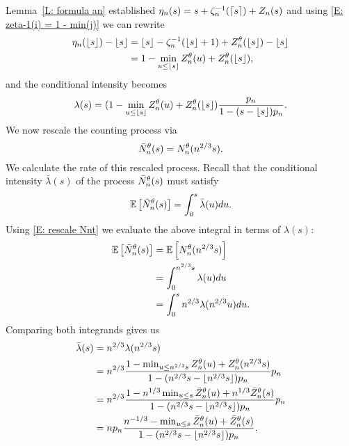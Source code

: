 Lemma~\ref{L: formula an} established $\eta_n(s) = s + \zeta^{-1}_n(\lceil s\rceil) + Z_n(s)$ 
and using \eqref{E: zeta-1(i) = 1 - min(j)} we can rewrite
\begin{equation*}
\begin{aligned}
\eta_n(\lfloor s\rfloor) - \lfloor s\rfloor 
&= \lfloor s\rfloor - \zeta^{-1}_n(\lfloor s\rfloor+1) + Z_n^{\theta}(\lfloor s\rfloor) - \lfloor s\rfloor \\
&= 1 - \min_{u \leq \lfloor s\rfloor} Z_n^{\theta}(u) + Z_n^{\theta}(\lfloor s\rfloor),
\end{aligned}
\end{equation*}
and the conditional intensity becomes
\begin{equation} \label{E: rate Nnt 2}
\lambda(s) = (1 - \min_{u \leq \lfloor s\rfloor} Z_n^{\theta}(u) + Z_n^{\theta}(\lfloor s\rfloor) \frac{p_n}{1-(s-\lfloor s\rfloor)p_n}.
\end{equation}
We now rescale the counting process via
\begin{equation} \label{E: rescale Nnt}
\bar{N}_n^{\theta}(s) = N_n^{\theta}(n^{2 / 3}s).
\end{equation}
We calculate the rate of this rescaled process.
Recall that the conditional intensity $\bar{\lambda}(s)$ of the process $\bar{N}_n^{\theta}(s)$ must satisfy
\begin{equation}
\mathbb{E} \left[ \bar{N}_n^{\theta}(s) \right] = \int_{0}^{s} \bar{\lambda}(u) du.
\end{equation}
Using \eqref{E: rescale Nnt} we evaluate the above integral in terms of $\lambda(s)$:
\begin{equation*}
\begin{aligned}
\mathbb{E} \left[ \bar{N}_n^{\theta}(s) \right]
&= \mathbb{E} \left[ N_n^{\theta}(n^{2 / 3}s) \right] \\
&= \int_{0}^{n^{2 / 3}s} \lambda(u) du \\
&= \int_{0}^{s} n^{2 / 3} \lambda(n^{2 / 3}u) du.
\end{aligned}
\end{equation*}
Comparing both integrands gives us
\begin{equation} \label{E: conditional intensity final}
\begin{aligned}
\bar{\lambda}(s)
&= n^{2 / 3} \lambda(n^{2 / 3}s) \\
&= n^{2 / 3} \frac{1 - \min_{u \leq n^{2 / 3}s} Z_n^{\theta}(u) + Z_n^{\theta}(n^{2 / 3}s)}{1 - (n^{2 / 3}s - \lfloor n^{2 / 3}s\rfloor)p_n} p_n \\
&= n^{2 / 3} \frac{1 - n^{1 / 3} \min_{u \leq s} \bar{Z}^{\theta}_n(u) + n^{1 / 3}\bar{Z}^{\theta}_n(s)}{1 - (n^{2 / 3}s - \lfloor n^{2 / 3}s\rfloor)p_n} p_n \\
&= n p_n \frac{n^{-1 / 3} - \min_{u \leq s} \bar{Z}^{\theta}_n(u) + \bar{Z}^{\theta}_n(s)}{1 - (n^{2 / 3}s - \lfloor n^{2 / 3}s\rfloor)p_n}.
\end{aligned}
\end{equation}

